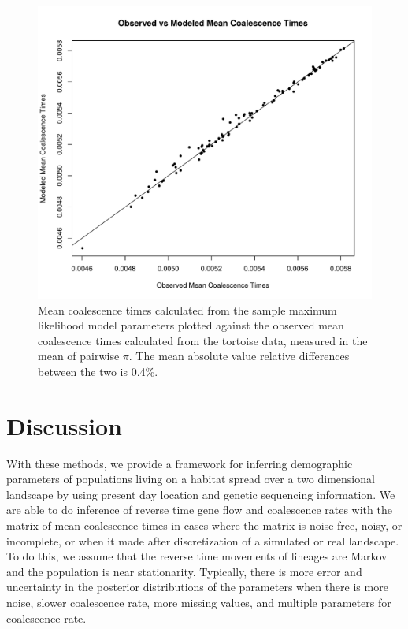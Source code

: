 \documentclass{article}
\begin{document}
\begin{figure}
\centering
 \includegraphics[scale=.8]{figs/tort_h_comp}
\caption{
    Mean coalescence times calculated from the sample maximum likelihood model parameters 
    plotted against the observed mean coalescence times calculated from the tortoise data, 
    measured in the mean of pairwise $\pi$.
    The mean absolute value relative differences between the two is 0.4\%.
    } \label{fig:tort_h_comp}
\end{figure}


\section*{Discussion}

With these methods, we provide a framework for
inferring demographic parameters of 
populations living on a habitat spread over a two dimensional landscape 
by using present day location and genetic sequencing information.
We are able to do inference of reverse time gene flow and coalescence rates 
with the matrix of mean coalescence times
in cases where the matrix is noise-free, noisy, or incomplete, 
or when it made after discretization of a simulated or real landscape.
To do this, we assume that the reverse time movements of lineages are Markov
and the population is near stationarity.
Typically, there is more error and uncertainty in the posterior distributions of the parameters
when there is more noise, slower coalescence rate, more missing values,
and multiple parameters for coalescence rate.
\end{document}
